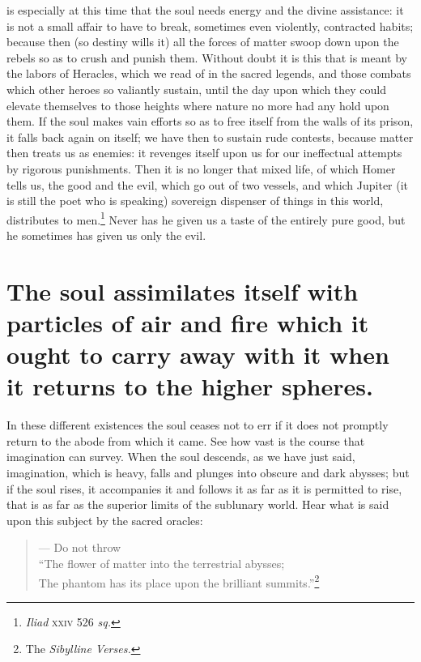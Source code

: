 \documentclass[12pt]{article}
\begin{document}
is especially at this time that the soul needs energy and the divine
assistance: it is not a small affair to have to break, sometimes even
violently, contracted habits; because then (so destiny wills it) all the forces
of matter swoop down upon the rebels so as to crush and punish them. Without
doubt it is this that is meant by the labors of Heracles, which we read of in
the sacred legends, and those combats which other heroes so valiantly sustain,
until the day upon which they could elevate themselves to those heights where
nature no more had any hold upon them. If the soul makes vain efforts so as to
free itself from the walls of its prison, it falls back again on itself; we
have then to sustain rude contests, because matter then treats us as enemies:
it revenges itself upon us for our ineffectual attempts by rigorous
punishments. Then it is no longer that mixed life, of which Homer tells us, the
good and the evil, which go out of two vessels, and which Jupiter (it is still
the poet who is speaking) sovereign dispenser of things in this world,
distributes to men.\footnote{\textit{Iliad} \textsc{xxiv} 526 \textit{sq.}}
Never has he given us a taste of the entirely pure good, but he sometimes has
given us only the evil.


\section{The soul assimilates itself with particles of air and fire which it
ought to carry away with it when it returns to the higher spheres.}

In these different existences the soul ceases not to err if it does not
promptly return to the abode from which it came. See how vast is the course
that imagination can survey. When the soul descends, as we have just said,
imagination, which is heavy, falls and plunges into obscure and dark abysses;
but if the soul rises, it accompanies it and follows it as far as it is
permitted to rise, that is as far as the superior limits of the sublunary
world. Hear what is said upon this subject by the sacred oracles:

\begin{verse}
--- Do not throw\\
``The flower of matter into the terrestrial abysses;\\
The phantom has its place upon the brilliant
summits.''\footnote{The \textit{Sibylline Verses.}}
\end{verse}
\end{document}
